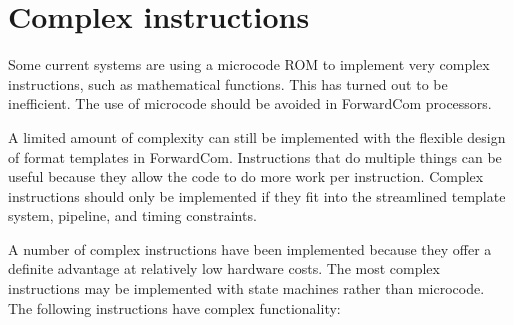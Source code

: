 \documentclass[forwardcom.tex]{subfiles}
\begin{document}
\section{Complex instructions}\label{ComplexInstructions}
Some current systems are using a microcode ROM to implement very complex instructions, such as mathematical functions. This has turned out to be inefficient. The use of microcode should be avoided in ForwardCom processors. 
\vv

A limited amount of complexity can still be implemented with the flexible design of format templates in ForwardCom. Instructions that do multiple things can be useful because they allow the code to do more work per instruction. Complex instructions should only be implemented if they fit into the streamlined template system, pipeline, and timing constraints. 
\vv

A number of complex instructions have been implemented because they offer a definite advantage at relatively low hardware costs. The most complex instructions may be implemented with state machines rather than microcode. 
The following instructions have complex functionality:
\end{document}
